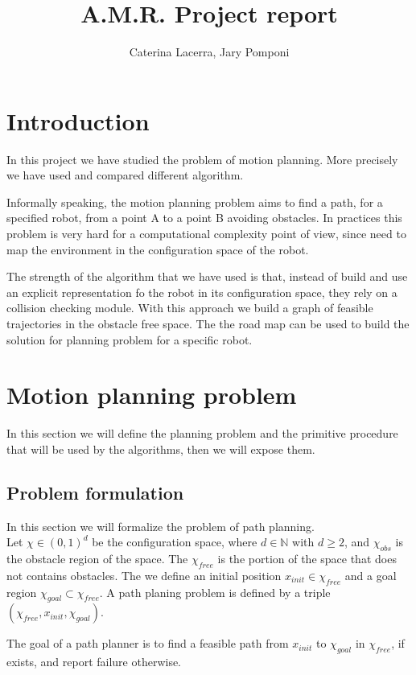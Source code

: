 \documentclass[10pt]{article}
\title{A.M.R. Project report}
\author{Caterina Lacerra, Jary Pomponi}
\begin{document}
	\maketitle
	\section{Introduction}
	In this project we have studied the problem of motion planning. More precisely we have used and compared different algorithm. 
	
	Informally speaking, the motion planning problem aims to find a path, for a specified robot, from a point A to a point B avoiding obstacles. In practices this problem is very hard for a computational complexity point of view, since need to map the environment in the configuration space of the robot. 
	
	The strength of the algorithm that we have used is that, instead of build and use an explicit representation fo the robot in its configuration space, they rely on a collision checking module. With this approach we build a graph of feasible trajectories in the obstacle free space. The the road map can be used to build the solution for planning problem for a specific robot.
	
	\section{Motion planning problem}
	In this section we will define the planning problem and the primitive procedure that will be used by the algorithms, then we will expose them.
	
	\subsection{Problem formulation}
	In this section we will formalize the problem of path planning.\\
	
	Let $\chi \in(0,1)^d$ be the configuration space, where $d\in\mathbb{N}$ with $d\ge2$, and $\chi_{obs}$ is the obstacle region of the space. The $\chi_{free}$ is the portion of the space that does not contains obstacles.
	The we define an initial position $x_{init} \in \chi_{free}$ and a goal region $\chi_{goal} \subset \chi_{free}$. A path planing problem is defined by a triple $(\chi_{free},x_{init},\chi_{goal}) $. 
	
	The goal of a path planner is to find a feasible path from $x_{init}$ to $\chi_{goal}$ in $\chi_{free}$, if exists, and report failure otherwise.\\
	
\end{document}
